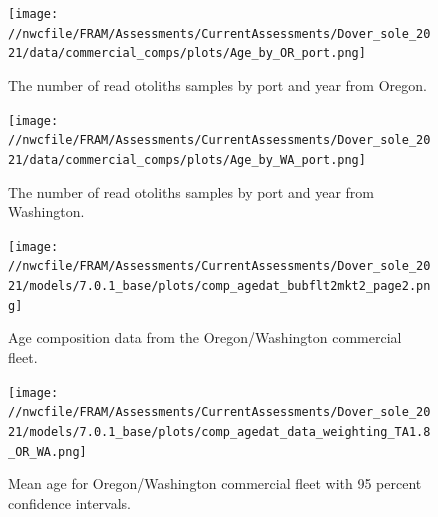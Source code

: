 \documentclass[11pt,
  english,
  a4paper,
]{article}
\begin{document}

\begin{figure}
\centering
\texttt{[image: //nwcfile/FRAM/Assessments/CurrentAssessments/Dover\_sole\_2021/data/commercial\_comps/plots/Age\_by\_OR\_port.png]}
\caption{The number of read otoliths samples by port and year from Oregon.\label{fig:or-age-port}}
\end{figure}

\tagmcend\tagstructend

\clearpage


\begin{figure}
\centering
\texttt{[image: //nwcfile/FRAM/Assessments/CurrentAssessments/Dover\_sole\_2021/data/commercial\_comps/plots/Age\_by\_WA\_port.png]}
\caption{The number of read otoliths samples by port and year from Washington.\label{fig:wa-age-port}}
\end{figure}

\tagmcend\tagstructend


\begin{figure}
\centering
\texttt{[image: //nwcfile/FRAM/Assessments/CurrentAssessments/Dover\_sole\_2021/models/7.0.1\_base/plots/comp\_agedat\_bubflt2mkt2\_page2.png]}
\caption{Age composition data from the Oregon/Washington commercial fleet.\label{fig:orwa-age-data}}
\end{figure}

\tagmcend\tagstructend


\begin{figure}
\centering
\texttt{[image: //nwcfile/FRAM/Assessments/CurrentAssessments/Dover\_sole\_2021/models/7.0.1\_base/plots/comp\_agedat\_data\_weighting\_TA1.8\_OR\_WA.png]}
\caption{Mean age for Oregon/Washington commercial fleet with 95 percent confidence intervals.\label{fig:mean-orwa-age-data}}
\end{figure}

\tagmcend\tagstructend
\end{document}
